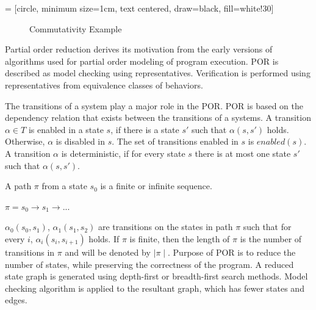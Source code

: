  = [circle, minimum size=1cm, text centered, draw=black, fill=white!30]

\begin{figure}[h]
\centering
{}
\caption{Commutativity Example}
\label{commutativity_example}
\end{figure}

Partial order reduction derives its motivation from the early versions of algorithms used for partial order modeling of program execution. 
POR is described as model checking using representatives\cite{por_repr}. 
Verification is performed using representatives from equivalence classes of behaviors. 

The transitions of a system play a major role in the POR. 
POR is based on the dependency relation that exists between the transitions of a systems. 
A transition $\alpha \in T$ is enabled in a state $s$, if there is a state $s'$ such that $\alpha(s, s')$ holds. 
Otherwise, $\alpha$ is disabled in $s$. 
The set of transitions enabled in $s$ is $enabled(s)$. 
A transition $\alpha$ is deterministic, if for every state $s$ there is at most one state $s'$ such that $\alpha(s, s')$. 

A path $\pi$ from a state $s_0$ is a finite or infinite sequence. 

$\pi = s_0 \rightarrow s_1 \rightarrow ...$

$\alpha_0(s_0, s_1)$, $\alpha_1(s_1, s_2)$ are transitions on the states in path $\pi$ such that for every $i$, $\alpha_i(s_i, s_{i+1})$ holds. 
If $\pi$ is finite, then the length of $\pi$ is the number of transitions in $\pi$ and will be denoted by $\mid \pi \mid$. 
Purpose of POR is to reduce the number of states, while preserving the correctness of the program. 
A reduced state graph is generated using depth-first or breadth-first search methods. 
Model checking algorithm is applied to the resultant graph, which has fewer states and edges. 

